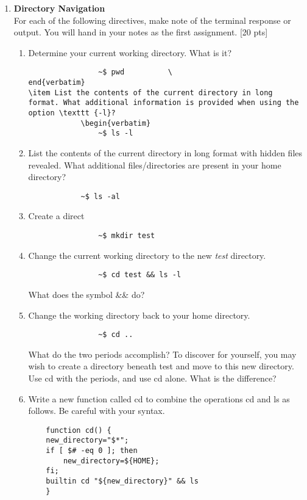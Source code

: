\documentclass[11 pt,USletter,oneside]{article}
\begin{document}
\begin{enumerate}
\item \textbf { Directory Navigation} \\ For each of the following directives, make note of the terminal response or output.  You will hand in your notes as the first assignment. [20 pts]
\begin{enumerate}

\item Determine your current working directory.  What is it?
    		\begin{verbatim}
    			~$ pwd    		\
end{verbatim}
\item List the contents of the current directory in long format. What additional information is provided when using the option \texttt {-l}?
    		\begin{verbatim}
    			~$ ls -l
    		\end{verbatim}
\item List the contents of the current directory in long format with hidden files revealed. What additional files/directories are present in your home directory?
	\begin{verbatim}   
 			~$ ls -al
    		\end{verbatim}
\item Create a direct
    		\begin{verbatim}
    			~$ mkdir test
    		\end{verbatim}\item Change the current working
 directory to the new \textit {test} directory.
    		\begin{verbatim}
    			~$ cd test && ls -l
    		\end{verbatim}What does the symbol \&\& do?\\

\item Change the working directory back to your home directory.
    		\begin{verbatim}
    			~$ cd ..
    		\end{verbatim}
What do the two periods accomplish? To discover for yourself, you may wish to create a directory beneath test and move to this new directory.  Use cd with the periods, and use cd alone.  What is the difference?\\
 
\item Write a new function called cd to combine the operations cd and ls as follows.  Be careful with your syntax.
\begin{verbatim}
	function cd() {
    new_directory="$*";
    if [ $# -eq 0 ]; then 
        new_directory=${HOME};
    fi;
    builtin cd "${new_directory}" && ls
	}
	

\end{verbatim}
\end{enumerate}
\end{enumerate}
\end{document}
